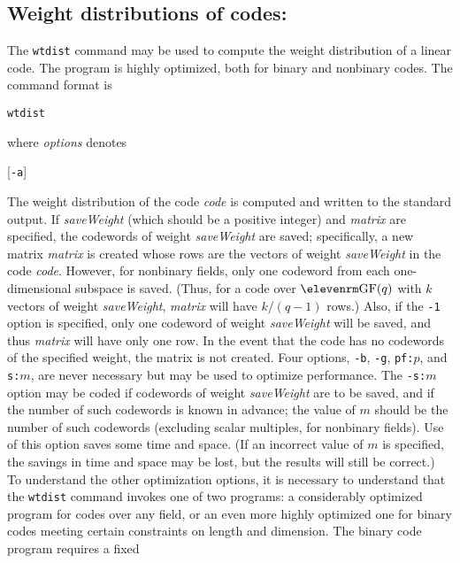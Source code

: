\subsection{Weight distributions of codes:}The {\tt wtdist}
command may be used to compute the weight distribution of a linear code.
The program is highly optimized, both for binary and nonbinary codes.
The command format is
%
\smallskip
\centerline{{\tt wtdist}}
\smallskip
where {\it options\/} denotes
\smallskip
\centerline{
        [{\tt -a}]\enskip
        [{\tt -b}]\enskip
        [{\tt -g}]\enskip
        [{\tt -n:}{\it name\/}]\enskip
        [{\tt -p:}{\it path\/}]\enskip
        [{\tt -pf:}$p$]\enskip
        [{\tt -s:}$m$]\enskip
        [{\tt -q}]\enskip
        [{\tt -1}]}
\smallskip
The weight distribution of the code {\it code\/} is computed and written to
the standard output.  If {\it saveWeight\/} (which should be a positive
integer) and {\it matrix\/} are specified, the codewords of weight
{\it saveWeight\/} are saved; specifically, a new matrix {\it matrix\/} is
created whose rows are the vectors of weight {\it saveWeight\/} in the
code {\it code}.  However, for nonbinary fields, only one codeword from
each one-dimensional subspace is saved.  (Thus, for a code over 
${\rm GF}(q)$ with $k$ vectors of weight {\it saveWeight}, {\it matrix\/} will
have $k/(q-1)$ rows.)  Also, if the {\tt -1} option is specified, only one
codeword of weight {\it saveWeight\/} will be saved, and thus {\it matrix\/}
will have only one row.  In the event that the code has no codewords of the
specified weight, the matrix is not created.
\medbreak
Four options, {\tt -b}, {\tt -g}, {\tt pf:}$p$, and {\tt s:}$m$, are never
necessary but may be used to optimize performance.  The {\tt -s:}$m$
option may be coded if codewords of weight {\it saveWeight\/} are to be
saved, and if the number of such codewords is known in advance; the value
of $m$ should be the number of such codewords (excluding scalar multiples,
for nonbinary fields).  Use of this option saves some time and space.  (If
an incorrect value of $m$ is specified, the savings in time and space may
be lost, but the results will still be correct.)
\medbreak
To understand the other optimization options,
it is necessary to understand that the {\tt wtdist} command invokes one of 
two programs: a considerably optimized program for codes over any field, or 
an even more highly optimized one for binary codes meeting certain 
constraints on length and dimension.  The binary code program requires a fixed
